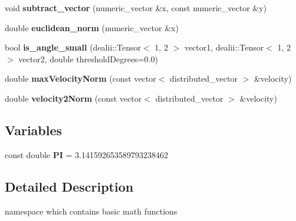 \begin{DoxyCompactItemize}
\item 
\hypertarget{namespacenatrium_1_1Math_aa836548ce124ae68fe267d0c988add9b}{
void {\bfseries subtract\_\-vector} (numeric\_\-vector \&x, const numeric\_\-vector \&y)}
\label{namespacenatrium_1_1Math_aa836548ce124ae68fe267d0c988add9b}

\item 
\hypertarget{namespacenatrium_1_1Math_a3fbf64e851a081a568d1fce928380074}{
double {\bfseries euclidean\_\-norm} (numeric\_\-vector \&x)}
\label{namespacenatrium_1_1Math_a3fbf64e851a081a568d1fce928380074}

\item 
\hypertarget{namespacenatrium_1_1Math_a5e27b57b0c8ef5db261c6fd6cc7f8b08}{
bool {\bfseries is\_\-angle\_\-small} (dealii::Tensor$<$ 1, 2 $>$ vector1, dealii::Tensor$<$ 1, 2 $>$ vector2, double thresholdDegrees=0.0)}
\label{namespacenatrium_1_1Math_a5e27b57b0c8ef5db261c6fd6cc7f8b08}

\item 
\hypertarget{namespacenatrium_1_1Math_a9e700098d3aab2d0e0ed0b5be4b1137a}{
double {\bfseries maxVelocityNorm} (const vector$<$ distributed\_\-vector $>$ \&velocity)}
\label{namespacenatrium_1_1Math_a9e700098d3aab2d0e0ed0b5be4b1137a}

\item 
\hypertarget{namespacenatrium_1_1Math_a4d98cdb7fc5423722f75bf6e6440a1d3}{
double {\bfseries velocity2Norm} (const vector$<$ distributed\_\-vector $>$ \&velocity)}
\label{namespacenatrium_1_1Math_a4d98cdb7fc5423722f75bf6e6440a1d3}

\end{DoxyCompactItemize}
\subsection*{Variables}
\begin{DoxyCompactItemize}
\item 
\hypertarget{namespacenatrium_1_1Math_a1ef5edf004cf147f3b3e9d36a7af4b00}{
const double {\bfseries PI} = 3.141592653589793238462}
\label{namespacenatrium_1_1Math_a1ef5edf004cf147f3b3e9d36a7af4b00}

\end{DoxyCompactItemize}


\subsection{Detailed Description}
namespace which contains basic math functions 